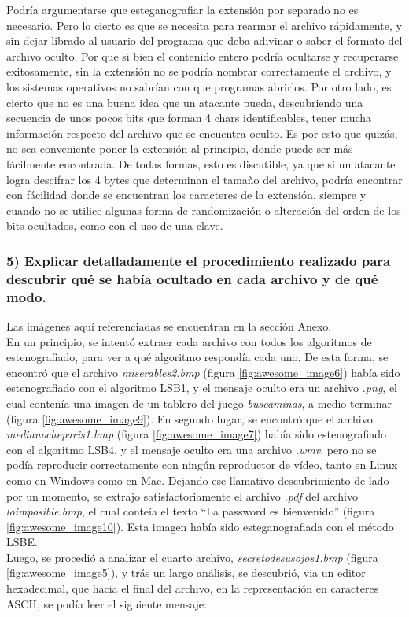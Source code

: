 \documentclass[a4paper,10pt]{article}
\begin{document}
Podría argumentarse que esteganografiar la extensión por separado no es necesario. Pero lo cierto es que se necesita para rearmar el archivo rápidamente, y sin dejar librado
al usuario del programa que deba adivinar o saber el formato del archivo oculto. Por que si bien el contenido entero podría ocultarse y recuperarse exitosamente, sin la extensión
no se podría nombrar correctamente el archivo, y los sistemas operativos no sabrían con que programas abrirlos. Por otro lado, es cierto que no es una buena idea que 
un atacante pueda, descubriendo una secuencia de unos pocos bits que forman 4 chars identificables, tener mucha información respecto del archivo que se encuentra oculto.
Es por esto que quizás, no sea conveniente poner la extensión al principio, donde puede ser más fácilmente encontrada. De todas formas, esto es discutible, ya que si un atacante logra
descifrar los 4 bytes que determinan el tamaño del archivo, podría encontrar con fácilidad donde se encuentran los caracteres de la extensión, siempre y cuando no se utilice algunas
forma de randomización o alteración del orden de los bits ocultados, como con el uso de una clave.\\

\subsubsection*{ 5) Explicar detalladamente el procedimiento realizado para descubrir qué se había ocultado en
cada archivo y de qué modo.}

Las imágenes aquí referenciadas se encuentran en la sección Anexo.\\

En un principio, se intentó extraer cada archivo con todos los algoritmos de estenografiado, para ver a qué algoritmo respondía cada uno. De esta forma, se 
encontró que el archivo \textit{miserables2.bmp} (figura \ref{fig:awesome_image6}) había sido estenografiado con el algoritmo LSB1, y el mensaje oculto era un archivo \textit{.png}, el cual contenía una 
imagen de un tablero del juego \textit{buscaminas}, a medio terminar (figura \ref{fig:awesome_image9}). En segundo lugar, se encontró que el archivo 
\textit{medianocheparis1.bmp} (figura \ref{fig:awesome_image7}) había sido estenografiado 
con el algoritmo LSB4, y el mensaje oculto era una archivo \textit{.wmv}, pero no se podía reproducir correctamente con ningún reproductor de vídeo, 
tanto en Linux como en Windows como en Mac.
Dejando ese llamativo descubrimiento de lado por un momento, se extrajo satisfactoriamente el archivo \textit{.pdf} del archivo \textit{loimposible.bmp}, el cual conteía el texto
``La password es bienvenido'' (figura \ref{fig:awesome_image10}). Esta imagen había sido esteganografiada con el método LSBE.\\
Luego, se procedió a analizar el cuarto archivo, \textit{secretodesusojos1.bmp} (figura \ref{fig:awesome_image5}), y trás un largo análisis, se descubrió, via un editor hexadecimal, 
que hacia el final del archivo, en la representación en caracteres ASCII, se podía leer el siguiente mensaje: \\
\end{document}
